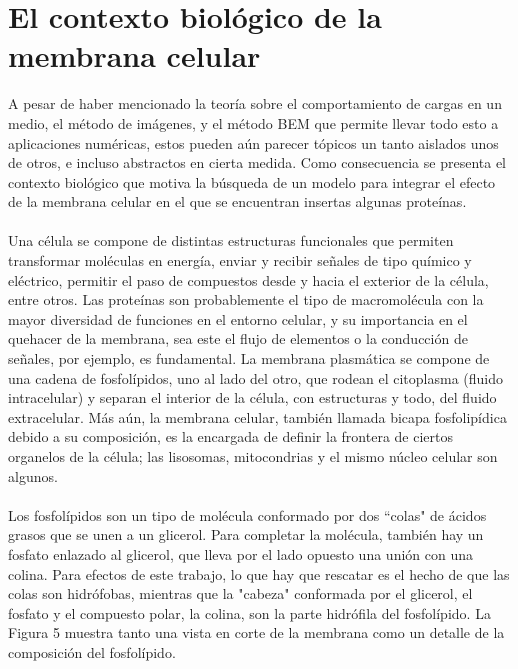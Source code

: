\documentclass[12pt, oneside, numbers, spanish]{ezthesis}
\numberwithin{equation}{section}
\begin{document}
\section{El contexto biológico de la membrana celular}
A pesar de haber mencionado la teoría sobre el comportamiento de cargas en un medio, el método de imágenes, y el método BEM que permite llevar todo esto a aplicaciones numéricas, estos pueden aún parecer tópicos un tanto aislados unos de otros, e incluso abstractos en cierta medida. Como consecuencia se presenta el contexto biológico que motiva la búsqueda de un modelo para integrar el efecto de la membrana celular en el que se encuentran insertas algunas proteínas.\\\\
Una célula se compone de distintas estructuras funcionales que permiten transformar moléculas en energía, enviar y recibir señales de tipo químico y eléctrico, permitir el paso de compuestos desde y hacia el exterior de la célula, entre otros. Las proteínas son probablemente el tipo de macromolécula con la mayor diversidad de funciones en el entorno celular, y su importancia en el quehacer de la membrana, sea este el flujo de elementos o la conducción de señales, por ejemplo, es fundamental. La membrana plasmática se compone de una cadena de fosfolípidos, uno al lado del otro, que rodean el citoplasma (fluido intracelular) y separan el interior de la célula, con estructuras y todo, del fluido extracelular. Más aún, la membrana celular, también llamada bicapa fosfolipídica debido a su composición, es la encargada de definir la frontera de ciertos organelos de la célula; las lisosomas, mitocondrias y el mismo núcleo celular son algunos.\\\\
Los fosfolípidos son un tipo de molécula conformado por dos ``colas" de ácidos grasos que se unen a un glicerol. Para completar la molécula, también hay un fosfato enlazado al glicerol, que lleva por el lado opuesto una unión con una colina. Para efectos de este trabajo, lo que hay que rescatar es el hecho de que las colas son hidrófobas, mientras que la "cabeza" conformada por el glicerol, el fosfato y el compuesto polar, la colina, son la parte hidrófila del fosfolípido. La Figura 5 muestra tanto una vista en corte de la membrana como un detalle de la composición del fosfolípido.
%	
\end{document}
